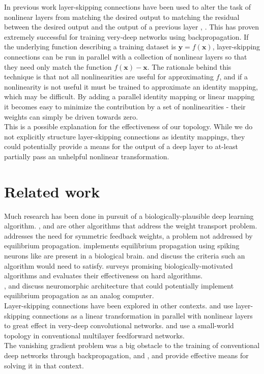 \documentclass{article}
\newcommand{\mtx}[1]{\bm{#1}}
\newcommand{\npar}{\\\indent}
\begin{document}
In previous work layer-skipping connections have been used to alter the task of nonlinear layers from matching the desired output to matching the residual between the desired output and the output of a previous layer \cite{he2015}, \cite{ioffe2015}. This has proven extremely successful for training very-deep networks using backpropagation. If the underlying function describing a training dataset is $\mtx{y}=f(\mtx{x})$, layer-skipping connections can be run in parallel with a collection of nonlinear layers so that they need only match the function $f(\mtx{x})-\mtx{x}$. The rationale behind this technique is that not all nonlinearities are useful for approximating $f$, and if a nonlinearity is not useful it must be trained to approximate an identity mapping, which may be difficult. By adding a parallel identity mapping or linear mapping it becomes easy to minimize the contribution by a set of nonlinearities - their weights can simply be driven towards zero.
\npar
This is a possible explanation for the effectiveness of our topology. While we do not explicitly structure layer-skipping connections as identity mappings, they could potentially provide a means for the output of a deep layer to at-least partially pass an unhelpful nonlinear transformation.


\section{Related work}

Much research has been done in pursuit of a biologically-plausible deep learning algorithm. \cite{lee2015}, \cite{xie2003} and \cite{pineda1987} are other algorithms that address the weight transport problem. \cite{lillicrap2014} addresses the need for symmetric feedback weights, a problem not addressed by equilibrium propagation. \cite{oconnor2018} implements equilibrium propagation using spiking neurons like are present in a biological brain. \cite{bengio2015} and \cite{???} discuss the criteria such an algorithm would need to satisfy. \cite{bartunov2018} surveys promising biologically-motivated algorithms and evaluates their effectiveness on hard algorithms.
\npar
\cite{shainline2019}, \cite{davies2018} and \cite{nahmias2013} discuss neuromorphic architecture that could potentially implement equilibrium propagation as an analog computer.
\npar
Layer-skipping connections have been explored in other contexts. \cite{he2015} and \cite{srivastava2015} use layer-skipping connections as a linear transformation in parallel with nonlinear layers to great effect in very-deep convolutional networks. \cite{xiaohu2011} and \cite{krishnan2019} use a small-world topology in conventional multilayer feedforward networks.
\npar
The vanishing gradient problem was a big obstacle to the training of conventional deep networks through backpropagation, and \cite{ioffe2015}, \cite{glorot2010} and \cite{???} provide effective means for solving it in that context.
\end{document}
